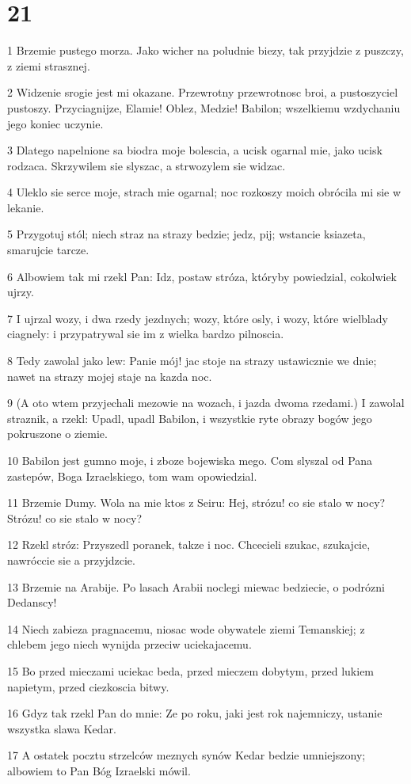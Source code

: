 \chapter{21}

\par 1 Brzemie pustego morza. Jako wicher na poludnie biezy, tak przyjdzie z puszczy, z ziemi strasznej.
\par 2 Widzenie srogie jest mi okazane. Przewrotny przewrotnosc broi, a pustoszyciel pustoszy. Przyciagnijze, Elamie! Oblez, Medzie! Babilon; wszelkiemu wzdychaniu jego koniec uczynie.
\par 3 Dlatego napelnione sa biodra moje bolescia, a ucisk ogarnal mie, jako ucisk rodzaca. Skrzywilem sie slyszac, a strwozylem sie widzac.
\par 4 Uleklo sie serce moje, strach mie ogarnal; noc rozkoszy moich obrócila mi sie w lekanie.
\par 5 Przygotuj stól; niech straz na strazy bedzie; jedz, pij; wstancie ksiazeta, smarujcie tarcze.
\par 6 Albowiem tak mi rzekl Pan: Idz, postaw stróza, któryby powiedzial, cokolwiek ujrzy.
\par 7 I ujrzal wozy, i dwa rzedy jezdnych; wozy, które osly, i wozy, które wielblady ciagnely: i przypatrywal sie im z wielka bardzo pilnoscia.
\par 8 Tedy zawolal jako lew: Panie mój! jac stoje na strazy ustawicznie we dnie; nawet na strazy mojej staje na kazda noc.
\par 9 (A oto wtem przyjechali mezowie na wozach, i jazda dwoma rzedami.) I zawolal straznik, a rzekl: Upadl, upadl Babilon, i wszystkie ryte obrazy bogów jego pokruszone o ziemie.
\par 10 Babilon jest gumno moje, i zboze bojewiska mego. Com slyszal od Pana zastepów, Boga Izraelskiego, tom wam opowiedzial.
\par 11 Brzemie Dumy. Wola na mie ktos z Seiru: Hej, strózu! co sie stalo w nocy? Strózu! co sie stalo w nocy?
\par 12 Rzekl stróz: Przyszedl poranek, takze i noc. Chcecieli szukac, szukajcie, nawróccie sie a przyjdzcie.
\par 13 Brzemie na Arabije. Po lasach Arabii noclegi miewac bedziecie, o podrózni Dedanscy!
\par 14 Niech zabieza pragnacemu, niosac wode obywatele ziemi Temanskiej; z chlebem jego niech wynijda przeciw uciekajacemu.
\par 15 Bo przed mieczami uciekac beda, przed mieczem dobytym, przed lukiem napietym, przed ciezkoscia bitwy.
\par 16 Gdyz tak rzekl Pan do mnie: Ze po roku, jaki jest rok najemniczy, ustanie wszystka slawa Kedar.
\par 17 A ostatek pocztu strzelców meznych synów Kedar bedzie umniejszony; albowiem to Pan Bóg Izraelski mówil.

